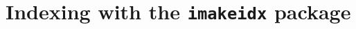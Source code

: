 \documentclass[a4paper]{article}
\begin{document}
\section*{Indexing with the \texttt{imakeidx} package}

\cite{knuth:ct,knuth:ct:a,knuth:ct:c,knuth:ct:d}
\cite{aristotle:anima,aristotle:poetics,aristotle:physics,aristotle:rhetoric}

\clearpage

\printbibliography
\raggedright
{}%
\end{document}
